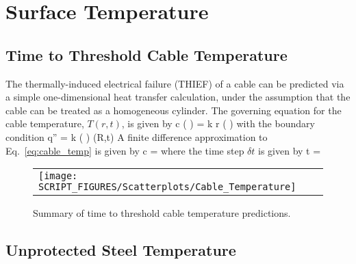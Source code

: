 
\chapter{Surface Temperature}
\label{Surface_Temperature_Chapter}

\clearpage

\section{Time to Threshold Cable Temperature}

The thermally-induced electrical failure (THIEF) of a cable can be predicted via a simple
one-dimensional heat transfer calculation, under the assumption that the cable can be
treated as a homogeneous cylinder. The governing equation for the cable temperature,
$T(r,t)$, is given by
\be
\rho c \left(  \right) =   k r \left(  \right)
\label{eq:cable_temp}
\ee
with the boundary condition
\be
\dot q'' = k \left(  \right) (R,t)
\ee
A finite difference approximation to Eq.~\ref{eq:cable_temp} is given by
\be
\rho c  =   
\ee
where the time step $\delta t$ is given by
\be
\delta t = 
\ee

\begin{figure}[!ht]
\begin{center}
\begin{tabular}{l}
\texttt{[image: SCRIPT\_FIGURES/Scatterplots/Cable\_Temperature]}
\end{tabular}
\end{center}
\caption[Summary of time to threshold cable temperature predictions]
{Summary of time to threshold cable temperature predictions.}
\label{Surface_Temperature_THIEF_Summary}
\end{figure}

\clearpage


\section{Unprotected Steel Temperature}

